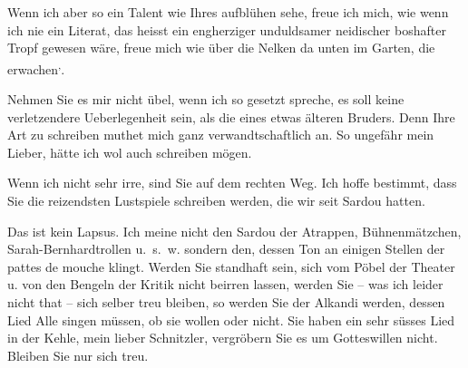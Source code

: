 \pstart
           Wenn ich aber so ein Talent wie Ihres aufblühen sehe, freue ich
               mich, wie wenn ich nie ein Literat, das heisst ein engherziger unduldsamer neidischer
               boshafter Tropf gewesen wäre, freue mich wie über die Nelken da unten im Garten, die
               erwachen\substVorne{}\textsuperscript{,}\substDazwischen{}.\substHinten{}{ }\strikeout{\textcolor{gray}{×}\-\textcolor{gray}{×}\-\textcolor{gray}{×}\-\textcolor{gray}{×}{ }\textcolor{gray}{×}\-\textcolor{gray}{×}\-\textcolor{gray}{×}{ }\textcolor{gray}{×}\-\textcolor{gray}{×}\-\textcolor{gray}{×}\-\textcolor{gray}{×}\-\textcolor{gray}{×}{ }\textcolor{gray}{×}\-\textcolor{gray}{×}\-\textcolor{gray}{×}}\pend
           
\pstart
           Nehmen Sie es mir nicht übel, wenn ich so gesetzt spreche, es soll keine
               verletzendere Ueberlegenheit sein, als die eines etwas älteren Bruders. Denn Ihre Art
               zu schreiben muthet mich ganz verwandtschaftlich an. So ungefähr mein Lieber, hätte
               ich wol auch {\pb}schreiben mögen.\pend
           
\pstart
           Wenn ich nicht sehr irre, sind Sie auf dem rechten Weg. Ich hoffe bestimmt, dass Sie
               die reizendsten Lustspiele schreiben werden, die wir seit Sardou hatten.\pend
           
\pstart
           Das ist kein Lapsus. Ich meine nicht den Sardou der Atrappen, Bühnenmätzchen, Sarah-Bernhardtrollen u. s. w. sondern den, dessen Ton an einigen Stellen
               der pattes de mouche klingt. Werden Sie
               standhaft sein, sich vom Pöbel der Theater u. von den Bengeln der Kritik nicht
               beirren lassen, werden Sie – was ich leider nicht that – sich selber treu bleiben, so
               werden Sie der Alkandi werden, dessen Lied
               Alle singen müssen, ob sie wollen oder nicht. Sie haben ein sehr süsses Lied in der
               Kehle, mein lieber Schnitzler, vergröbern {\pb}Sie es um Gotteswillen nicht. Bleiben
               Sie nur sich treu.\pend
           
